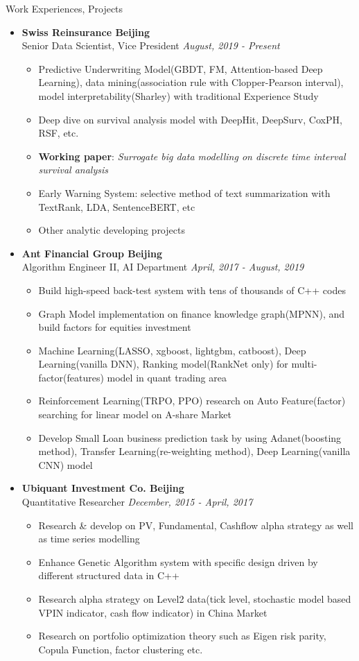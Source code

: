 \documentclass[a4paper,8pt,oneside]{scrartcl}
\newenvironment{ressection}[1]{
    \vspace{2pt}
    {\selectfont#1}
    \begin{itemize}
    \vspace{0pt}
}{
    \end{itemize}
}
\newcommand{\ressubitem}[1]{
    \vspace{0pt}
    \item #1
}
\newcommand{\resbigitem}[3]{
    \vspace{-5pt}
    \item
    \textbf{#1}\\
    #2
    \textit{#3}
}
\newenvironment{ressubsec}[3]{
    \resbigitem{#1}{#2}{#3}
    \vspace{-2pt}
    \begin{itemize}
}{
    \end{itemize}
}
\begin{document}
\begin{ressection}{Work Experiences, Projects}
  \begin{ressubsec}{Swiss Reinsurance \hfill Beijing}{Senior Data Scientist, Vice President}{\hfill August, 2019 - Present}
	  \ressubitem{Predictive Underwriting Model(GBDT, FM, Attention-based Deep Learning), data mining(association rule with Clopper-Pearson interval), model interpretability(Sharley) with traditional Experience Study}
	  \ressubitem{Deep dive on survival analysis model with DeepHit, DeepSurv, CoxPH, RSF, etc.}
	  \ressubitem{\textbf{Working paper}: \emph{Surrogate big data modelling on discrete time interval survival analysis}}
	  \ressubitem{Early Warning System: selective method of text summarization with TextRank, LDA, SentenceBERT, etc}
	  \ressubitem{Other analytic developing projects}
  \end{ressubsec}
  \begin{ressubsec}{Ant Financial Group \hfill Beijing}{Algorithm Engineer II, AI Department}{\hfill April, 2017 - August, 2019}
	  \ressubitem{Build high-speed back-test system with tens of thousands of C++ codes}
	  \ressubitem{Graph Model implementation on finance knowledge graph(MPNN), and build factors for equities investment}
	  \ressubitem{Machine Learning(LASSO, xgboost, lightgbm, catboost), Deep Learning(vanilla DNN), Ranking model(RankNet only) for multi-factor(features) model in quant trading area}
	  \ressubitem{Reinforcement Learning(TRPO, PPO) research on Auto Feature(factor) searching for linear model on A-share Market}
	  \ressubitem{Develop Small Loan business prediction task by using Adanet(boosting method), Transfer Learning(re-weighting method), Deep Learning(vanilla CNN) model}
  \end{ressubsec}
  \begin{ressubsec}{Ubiquant Investment Co. \hfill Beijing}{Quantitative Researcher}{\hfill December, 2015 - April, 2017}
	  \ressubitem{Research \& develop on PV, Fundamental, Cashflow alpha strategy as well as time series modelling}
	  \ressubitem{Enhance Genetic Algorithm system with specific design driven by different structured data in C++}
	  \ressubitem{Research alpha strategy on Level2 data(tick level, stochastic model based VPIN indicator, cash flow indicator) in China Market}
      \ressubitem{Research on portfolio optimization theory such as Eigen risk parity, Copula Function, factor clustering etc.}
  \end{ressubsec}

\end{ressection}
\end{document}
